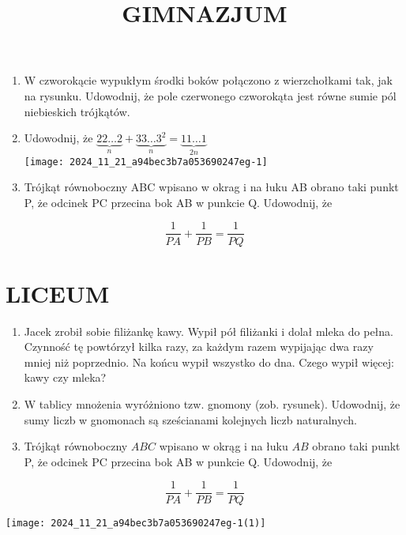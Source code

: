\documentclass[10pt]{article}
\title{GIMNAZJUM }
\author{}
\date{}
\begin{document}
\maketitle
\begin{enumerate}
  \item W czworokącie wypukłym środki boków połączono z wierzchołkami tak, jak na rysunku. Udowodnij, że pole czerwonego czworokąta jest równe sumie pól niebieskich trójkątów.
  \item Udowodnij, że \(\underbrace{22 \ldots 2}_{n}+\underbrace{33 \ldots 3^{2}}_{n}=\underbrace{11 \ldots 1}_{2 n}\)\\
\texttt{[image: 2024\_11\_21\_a94bec3b7a053690247eg-1]}
  \item Trójkąt równoboczny ABC wpisano w okrag i na łuku AB obrano taki punkt P, że odcinek PC przecina bok AB w punkcie Q. Udowodnij, że
\end{enumerate}

\[
\frac{1}{P A}+\frac{1}{P B}=\frac{1}{P Q}
\]

\section*{LICEUM}
\begin{enumerate}
  \item Jacek zrobił sobie filiżankę kawy. Wypił pół filiżanki i dolał mleka do pełna. Czynność tę powtórzył kilka razy, za każdym razem wypijając dwa razy mniej niż poprzednio. Na końcu wypił wszystko do dna. Czego wypił więcej: kawy czy mleka?
  \item W tablicy mnożenia wyróżniono tzw. gnomony (zob. rysunek). Udowodnij, że sumy liczb w gnomonach są sześcianami kolejnych liczb naturalnych.
  \item Trójkąt równoboczny \(A B C\) wpisano w okrąg i na łuku \(A B\) obrano taki punkt P, że odcinek PC przecina bok AB w punkcie Q. Udowodnij, że
\end{enumerate}

\[
\frac{1}{P A}+\frac{1}{P B}=\frac{1}{P Q}
\]

\begin{center}
\texttt{[image: 2024\_11\_21\_a94bec3b7a053690247eg-1(1)]}
\end{center}
\end{document}
